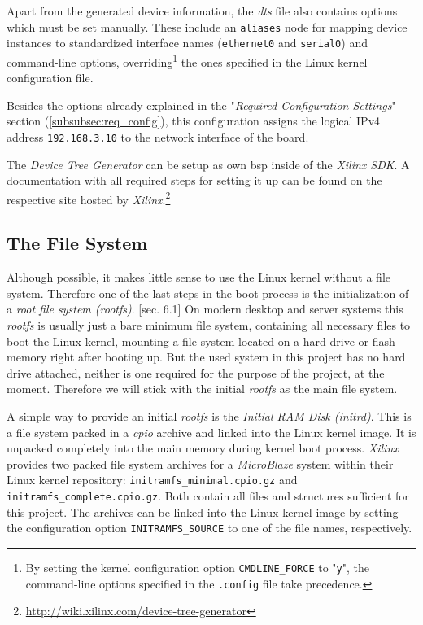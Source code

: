 Apart from the generated device information, the \textit{dts} file also contains options which must be set manually. These include an \texttt{aliases} node for mapping device instances to standardized interface names (\texttt{ethernet0} and \texttt{serial0}) and command-line options, overriding\footnote{By setting the kernel configuration option \texttt{CMDLINE\_FORCE} to "\texttt{y}", the command-line options specified in the \texttt{.config} file take precedence.} the ones specified in the Linux kernel configuration file.

Besides the options already explained in the "\textit{Required Configuration Settings}" section (\ref{subsubsec:req_config}), this configuration assigns the logical IPv4 address \texttt{192.168.3.10} to the network interface of the board.

The \textit{Device Tree Generator} can be setup as own \gls{bsp} inside of the \textit{Xilinx SDK}. A documentation with all required steps for setting it up can be found on the respective site hosted by \textit{Xilinx}.\footnote{\url{http://wiki.xilinx.com/device-tree-generator}}


\subsection{The File System}
\label{subsec:fs}

Although possible, it makes little sense to use the Linux kernel without a file system. Therefore one of the last steps in the boot process is the initialization of a \textit{root file system (rootfs)}. \cite{linuxPrimer}[sec. 6.1] On modern desktop and server systems this \textit{rootfs} is usually just a bare minimum file system, containing all necessary files to boot the Linux kernel, mounting a file system located on a hard drive or flash memory right after booting up. But the used system in this project has no hard drive attached, neither is one required for the purpose of the project, at the moment. Therefore we will stick with the initial \textit{rootfs} as the main file system.

A simple way to provide an initial \textit{rootfs} is the \textit{Initial RAM Disk (initrd)}. This is a file system packed in a \textit{cpio} archive and linked into the Linux kernel image. It is unpacked completely into the main memory during kernel boot process. \textit{Xilinx} provides two packed file system archives for a \textit{MicroBlaze} system within their Linux kernel repository: \texttt{initramfs\_minimal.cpio.gz} and \texttt{initramfs\_complete.cpio.gz}. Both contain all files and structures sufficient for this project. The archives can be linked into the Linux kernel image by setting the configuration option \texttt{INITRAMFS\_SOURCE} to one of the file names, respectively.

